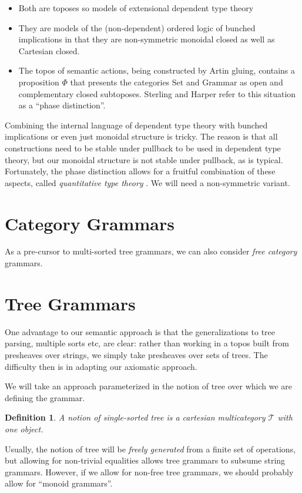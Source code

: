 \documentclass[12pt]{article}
\newcommand{\Set}{\textrm{Set}}
\newcommand{\Grammar}{\textrm{Grammar}}
\newtheorem{definition}{Definition}
\begin{document}
\begin{itemize}
\item Both are toposes so models of extensional dependent type theory
\item They are models of the (non-dependent) ordered logic of bunched
  implications in that they are non-symmetric monoidal closed as well
  as Cartesian closed.
\item The topos of semantic actions, being constructed by Artin
  gluing, contains a proposition $\Phi$ that presents the categories
  $\Set$ and $\Grammar$ as open and complementary closed
  subtoposes. Sterling and Harper refer to this situation as a ``phase
  distinction''.
\end{itemize}

Combining the internal language of dependent type theory with bunched
implications or even just monoidal structure is tricky. The reason is
that all constructions need to be stable under pullback to be used in
dependent type theory, but our monoidal structure is not stable under
pullback, as is typical.
%
Fortunately, the phase distinction allows for a fruitful combination
of these aspects, called \emph{quantitative type theory}
\cite{atkey-qtt,mcbride-nuttin}.
%
We will need a non-symmetric variant.

\section{Category Grammars}

As a pre-cursor to multi-sorted tree grammars, we can also consider
\emph{free category} grammars.

\section{Tree Grammars}

One advantage to our semantic approach is that the generalizations to
tree parsing, multiple sorts etc, are clear: rather than working in a
topos built from presheaves over strings, we simply take presheaves
over sets of trees. The difficulty then is in adapting our axiomatic
approach.

We will take an approach parameterized in the notion of tree over
which we are defining the grammar.
\begin{definition}
  A notion of single-sorted tree is a cartesian multicategory
  $\mathcal T$ with one object.
\end{definition}
Usually, the notion of tree will be \emph{freely generated} from a
finite set of operations, but allowing for non-trivial equalities
allows tree grammars to subsume string grammars. However, if we allow
for non-free tree grammars, we should probably allow for ``monoid
grammars''.
\end{document}
